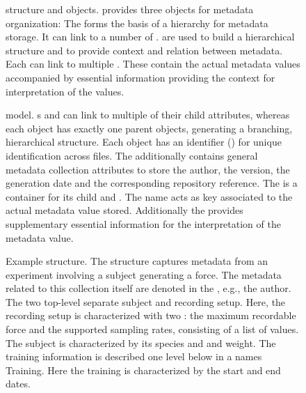 \begin{figure}
    \centering
    
    \caption[ structure and objects]{ structure and objects.  provides three objects for metadata organization: The   forms the basis of a hierarchy for metadata storage. It can link to a number of  .  are used to build a hierarchical structure and to provide context and relation between metadata. Each  can link to multiple . These contain the actual metadata values accompanied by essential information providing the context for interpretation of the values.}
    \label{fig:intro_odML_structure}
\end{figure}

\begin{figure}
    \centering
    \scalebox{0.8}{
    }
    \caption[ model]{ model. s and  can link to multiple of their child attributes, whereas each object has exactly one parent objects, generating a branching, hierarchical structure. Each object has an identifier () for unique identification across files. The  additionally contains general metadata collection attributes to store the author, the version, the generation date and the corresponding repository reference. The  is a container for its child  and . The  name acts as key associated to the actual metadata value stored. Additionally the  provides supplementary essential information for the interpretation of the metadata value.}
    \label{fig:intro_odML_model}
\end{figure}

\begin{figure}
 \centering
 \scalebox{0.45}{
 }
 \caption[Example  structure]{Example  structure. The  structure captures metadata from an experiment involving a subject generating a force. The metadata related to this collection itself are denoted in the  , e.g., the author. The two top-level  separate subject and recording setup. Here, the recording setup is characterized with two : the maximum recordable force and the supported sampling rates, consisting of a list of values. The subject is characterized by its species and and weight. The training information is described one level below in a  names Training. Here the training is characterized by the start and end dates.}
 \label{fig:intro_example_odml_structure}
\end{figure}

